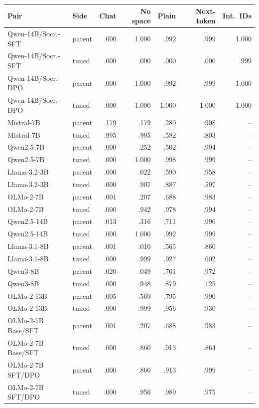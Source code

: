 \begin{table}[t]
\centering\scriptsize
\setlength{\tabcolsep}{1.7pt}
\begin{tabular}{@{}llrrrrr@{}}
\toprule
Pair & Side & Chat & No space & Plain & Next-token & Int.\ IDs \\
\midrule
Qwen-14B/Socr.-SFT & parent & .000 & 1.000 & .992 & .999 & 1.000 \\
Qwen-14B/Socr.-SFT & tuned & .000 & .000 & .000 & .000 & .999 \\
Qwen-14B/Socr.-DPO & parent & .000 & 1.000 & .992 & .999 & 1.000 \\
Qwen-14B/Socr.-DPO & tuned & .000 & 1.000 & 1.000 & 1.000 & 1.000 \\
Mistral-7B & parent & .179 & .179 & .280 & .908 & -- \\
Mistral-7B & tuned & .995 & .995 & .582 & .803 & -- \\
Qwen2.5-7B & parent & .000 & .252 & .502 & .994 & -- \\
Qwen2.5-7B & tuned & .000 & 1.000 & .998 & .999 & -- \\
Llama-3.2-3B & parent & .000 & .022 & .590 & .958 & -- \\
Llama-3.2-3B & tuned & .000 & .907 & .887 & .597 & -- \\
OLMo-2-7B & parent & .001 & .207 & .688 & .983 & -- \\
OLMo-2-7B & tuned & .000 & .942 & .978 & .994 & -- \\
Qwen2.5-14B & parent & .013 & .316 & .711 & .996 & -- \\
Qwen2.5-14B & tuned & .000 & 1.000 & .992 & .999 & -- \\
Llama-3.1-8B & parent & .001 & .010 & .565 & .860 & -- \\
Llama-3.1-8B & tuned & .000 & .999 & .927 & .602 & -- \\
Qwen3-8B & parent & .020 & .049 & .761 & .972 & -- \\
Qwen3-8B & tuned & .000 & .948 & .879 & .125 & -- \\
OLMo-2-13B & parent & .005 & .569 & .795 & .990 & -- \\
OLMo-2-13B & tuned & .000 & .999 & .956 & .930 & -- \\
OLMo-2-7B Base/SFT & parent & .001 & .207 & .688 & .983 & -- \\
OLMo-2-7B Base/SFT & tuned & .000 & .860 & .913 & .864 & -- \\
OLMo-2-7B SFT/DPO & parent & .000 & .860 & .913 & .999 & -- \\
OLMo-2-7B SFT/DPO & tuned & .000 & .956 & .989 & .975 & -- \\

\end{tabular}
\end{table}

